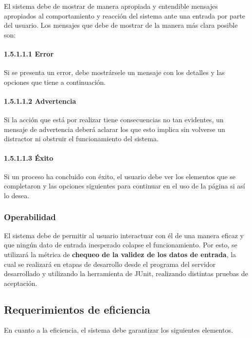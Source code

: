 \documentclass[a4paper]{article}
\newcommand\tab[1][0.55cm]{\hspace*{#1}}
\newcommand\gtab[1][1.5cm]{\hspace*{#1}}
\begin{document}
{\tab El sistema debe de mostrar de manera apropiada y entendible mensajes apropiados al comportamiento y reacción del sistema ante una entrada por parte del usuario. Los mensajes que debe de mostrar de la manera más clara posible son:
          

          \paragraph*{\gtab 1.5.1.1.1 Error} Si se presenta un error, debe mostrársele un mensaje con los detalles y las opciones que tiene a continuación.
      
          \paragraph*{\gtab 1.5.1.1.2 Advertencia} Si la acción que está por realizar tiene consecuencias no tan evidentes, un mensaje de advertencia deberá aclarar los que esto implica sin volverse un distractor ni obstruir el funcionamiento del sistema. 
          
          \paragraph*{\gtab 1.5.1.1.3 Éxito}  Si un proceso ha concluido con éxito, el usuario debe ver los elementos que se completaron y las opciones siguientes para continuar en el uso de la página si así lo desea.  
       
        \subsubsection{Operabilidad}
    	El sistema debe de permitir al usuario interactuar con él de una manera eficaz y que ningún dato de entrada inesperado colapse el funcionamiento. Por esto, se utilizará la métrica de \textbf{chequeo de la validez de los datos de entrada}, la cual se realizará en etapas de desarrollo desde el programa del servidor desarrollado y utilizando la herramienta de JUnit, realizando distintas pruebas de aceptación.
        

\color{Blue}
\subsection{Requerimientos de eficiencia}
\color{black} %
\justify 

	En cuanto a la eficiencia, el sistema debe garantizar los siguientes elementos. 
    
}
\end{document}
